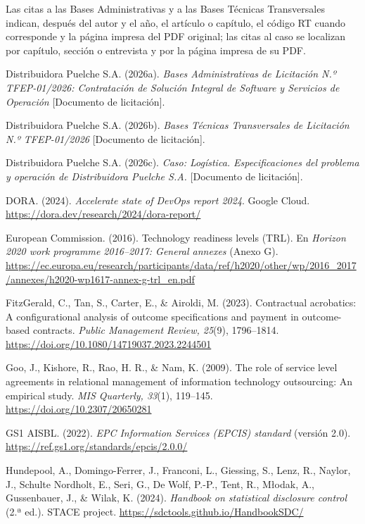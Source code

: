 Las citas a las Bases Administrativas y a las Bases Técnicas Transversales indican, después del autor y el año, el artículo o capítulo, el código RT cuando corresponde y la página impresa del PDF original; las citas al caso se localizan por capítulo, sección o entrevista y por la página impresa de su PDF.

\begin{list}{}{\setlength{\leftmargin}{1.27cm}\setlength{\itemindent}{-1.27cm}\setlength{\itemsep}{0.4em}\setlength{\parsep}{0pt}}
  \item Distribuidora Puelche S.A. (2026a). \emph{Bases Administrativas de Licitación N.º TFEP-01/2026: Contratación de Solución Integral de Software y Servicios de Operación} [Documento de licitación].
  \item Distribuidora Puelche S.A. (2026b). \emph{Bases Técnicas Transversales de Licitación N.º TFEP-01/2026} [Documento de licitación].
  \item Distribuidora Puelche S.A. (2026c). \emph{Caso: Logística. Especificaciones del problema y operación de Distribuidora Puelche S.A.} [Documento de licitación].
  \item DORA. (2024). \emph{Accelerate state of DevOps report 2024}. Google Cloud. \url{https://dora.dev/research/2024/dora-report/}
  \item European Commission. (2016). Technology readiness levels (TRL). En \emph{Horizon 2020 work programme 2016–2017: General annexes} (Anexo G). \url{https://ec.europa.eu/research/participants/data/ref/h2020/other/wp/2016_2017/annexes/h2020-wp1617-annex-g-trl_en.pdf}
  \item FitzGerald, C., Tan, S., Carter, E., \& Airoldi, M. (2023). Contractual acrobatics: A configurational analysis of outcome specifications and payment in outcome-based contracts. \emph{Public Management Review, 25}(9), 1796–1814. \url{https://doi.org/10.1080/14719037.2023.2244501}
  \item Goo, J., Kishore, R., Rao, H. R., \& Nam, K. (2009). The role of service level agreements in relational management of information technology outsourcing: An empirical study. \emph{MIS Quarterly, 33}(1), 119–145. \url{https://doi.org/10.2307/20650281}
  \item GS1 AISBL. (2022). \emph{EPC Information Services (EPCIS) standard} (versión 2.0). \url{https://ref.gs1.org/standards/epcis/2.0.0/}
  \item Hundepool, A., Domingo-Ferrer, J., Franconi, L., Giessing, S., Lenz, R., Naylor, J., Schulte Nordholt, E., Seri, G., De Wolf, P.-P., Tent, R., Młodak, A., Gussenbauer, J., \& Wilak, K. (2024). \emph{Handbook on statistical disclosure control} (2.ª ed.). STACE project. \url{https://sdctools.github.io/HandbookSDC/}

\end{list}
